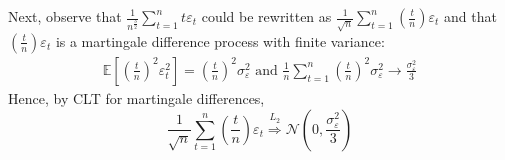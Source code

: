 \documentclass[]{article}
\begin{document}
\begin{enumerate}[label=(\alph*)]
	Next, observe that $\frac{1}{n^{\frac{3}{2}}}\sum\limits_{t = 1}^nt\varepsilon_t$ could be rewritten as $\frac{1}{\sqrt{n}}\sum\limits_{t = 1}^n(\frac{t}{n})\varepsilon_t$ and that $(\frac{t}{n})\varepsilon_t$ is a martingale difference process with finite variance:
	\begin{equation}
		\begin{split}
			\mathbb{E}[(\frac{t}{n})^2\varepsilon_t^2] = (\frac{t}{n})^2\sigma_\varepsilon^2 \nonumber
			\text{ and }
			\frac{1}{n}\sum\limits_{t = 1}^n(\frac{t}{n})^2\sigma_\varepsilon^2 \longrightarrow \frac{\sigma_\varepsilon^2}{3}
		\end{split}
	\end{equation}
	Hence, by CLT for martingale differences,
	\begin{equation}
		\frac{1}{\sqrt{n}}\sum\limits_{t = 1}^n(\frac{t}{n})\varepsilon_t \overset{L_2}{\Longrightarrow} \mathcal{N}(0, \frac{\sigma_\varepsilon^2}{3}) \nonumber
	\end{equation}
	

\end{enumerate}
\end{document}
